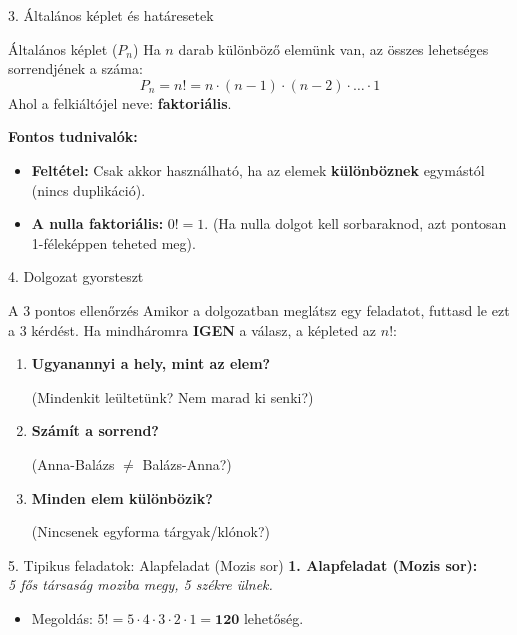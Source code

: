 \documentclass{beamer}
\begin{document}
\begin{frame}{3. Általános képlet és határesetek}
    \begin{block}{Általános képlet ($P_n$)}
        Ha $n$ darab különböző elemünk van, az összes lehetséges sorrendjének a száma:
        $$P_n = n! = n \cdot (n - 1) \cdot (n - 2) \cdot \dots \cdot 1$$
        Ahol a felkiáltójel neve: \textbf{faktoriális}.
    \end{block}

    \vspace{0.3cm}
    \textbf{Fontos tudnivalók:}
    \begin{itemize}
        \item \textbf{Feltétel:} Csak akkor használható, ha az elemek \textbf{különböznek} egymástól (nincs duplikáció).
        \item \textbf{A nulla faktoriális:} $0! = 1$. (Ha nulla dolgot kell sorbaraknod, azt pontosan 1-féleképpen teheted meg).
    \end{itemize}
\end{frame}

\begin{frame}{4. Dolgozat gyorsteszt}
    \begin{alertblock}{A 3 pontos ellenőrzés}
        Amikor a dolgozatban meglátsz egy feladatot, futtasd le ezt a 3 kérdést. Ha mindháromra \textbf{IGEN} a válasz, a képleted az $n!$:
    \end{alertblock}

    \begin{enumerate}
        \item \textbf{Ugyanannyi a hely, mint az elem?} \par (Mindenkit leültetünk? Nem marad ki senki?)
        \item \textbf{Számít a sorrend?} \par (Anna-Balázs $\neq$ Balázs-Anna?)
        \item \textbf{Minden elem különbözik?} \par (Nincsenek egyforma tárgyak/klónok?)
    \end{enumerate}
\end{frame}

\begin{frame}{5. Tipikus feladatok: Alapfeladat (Mozis sor)}
    \small
    \textbf{1. Alapfeladat (Mozis sor):} \\
    \emph{5 fős társaság moziba megy, 5 székre ülnek.}
    \begin{itemize}
        \item Megoldás: $5! = 5 \cdot 4 \cdot 3 \cdot 2 \cdot 1 = \mathbf{120}$ lehetőség.
    \end{itemize}
\end{frame}
\end{document}
